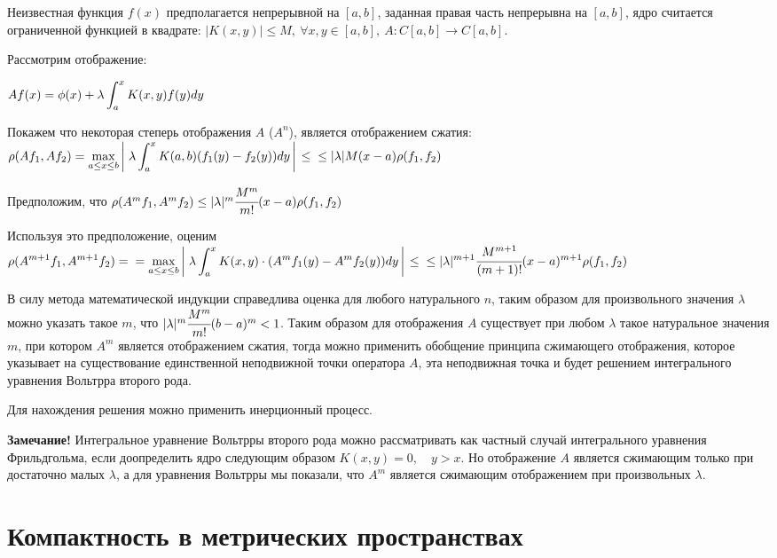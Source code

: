 \documentclass[12pt]{report}
\renewcommand{\[}{$\\\displaystyle}
\renewcommand{\]}{\\$}
\renewcommand{\[}{$\\\displaystyle}
\newcommand{\sep}{,\ }
\newcommand{\bb}[1][]{\left#1\vphantom{\int_1^2}\right.}
\begin{document}
Неизвестная функция $f(x)$ предполагается непрерывной на $[a,b]$, заданная правая часть непрерывна на $[a,b]$, ядро считается ограниченной функцией в квадрате: $|K(x,y)|\leq M\sep\forall x,y\in[a,b]\sep A:C[a,b]\rightarrow C[a,b]$.

Рассмотрим отображение:

\[ Af(x)=\phi(x)+\lambda\int_a^xK(x,y)f(y)dy \]

Покажем что некоторая степерь отображения $A$ ($A^n$), является отображением сжатия:
\[\rho(Af_1,Af_2)=\max_{a\leq x\leq b}\bb[|]\lambda\int_a^xK(a,b)(f_1(y)-f_2(y))dy\bb[|]\leq\\
\leq |\lambda|M(x-a)\rho(f_1,f_2)
\]

Предположим, что $\rho(A^mf_1,A^mf_2)\leq |\lambda|^m\cfrac{M^m}{m!}(x-a)\rho(f_1,f_2)$

Используя это предположение, оценим
\[
\rho(A^{m+1}f_1,A^{m+1}f_2)=\\
=\max_{a\leq x\leq b}\bb[|]\lambda\int_a^xK(x,y)\cdot(A^mf_1(y)-A^mf_2(y))dy\bb[|]\leq\\
\leq|\lambda|^{m+1}\cfrac{M^{m+1}}{(m+1)!}(x-a)^{m+1}\rho(f_1,f_2)
\]

В силу метода математической индукции справедлива оценка для любого натурального $n$, таким образом для произвольного значения $\lambda$ можно указать такое $m$, что $|\lambda|^m\cfrac{M^m}{m!}(b-a)^m<1$. Таким образом для отображения $A$ существует при любом $\lambda$ такое натуральное значения $m$, при котором $A^m$ является отображением сжатия, тогда можно применить обобщение принципа сжимающего отображения, которое  указывает на существование единственной неподвижной точки оператора $A$, эта неподвижная точка и будет решением интегрального уравнения Вольтрра второго рода.

Для нахождения решения можно применить инерционный процесс.

\textbf{Замечание!} Интегральное уравнение Вольтрры второго рода можно рассматривать как частный случай интегрального уравнения Фрильдгольма, если доопределить ядро следующим образом $K(x,y)=0,\quad y>x$. Но отображение $A$ является сжимающим только при достаточно малых $\lambda$, а для уравнения Вольтрры мы показали, что $A^m$ является сжимающим отображением при произвольных $\lambda$.

\section{Компактность в метрических пространствах}
\end{document}
